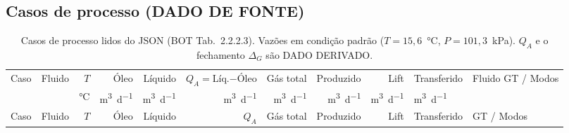 \documentclass[11pt,a4paper]{article}
\numberwithin{equation}{section}
\numberwithin{table}{section}
\numberwithin{figure}{section}
\newcommand{\tipo}[1]{\textsf{\footnotesize #1}}
\begin{document}
\begin{landscape}
\subsection{Casos de processo (DADO DE FONTE)}
\begin{longtable}{rlrrrrrrrll}
\caption{Casos de processo lidos do JSON (BOT Tab.~2.2.2.3). Vazões em condição padrão ($T=15{,}6$~\si{\celsius}, $P=101{,}3$~\si{\kilo\pascal}). $Q_A$ e o fechamento $\Delta_G$ são \tipo{DADO DERIVADO}.}\label{tab:casos}\\\toprule
Caso & Fluido & $T$ & Óleo & Líquido & $Q_A=$Líq.$-$Óleo & Gás total & Produzido & Lift & Transferido & Fluido GT / Modos\\
 & & \si{\celsius} & \si{\cubic\metre\per\day} & \si{\cubic\metre\per\day} & \si{\cubic\metre\per\day} & \si{\cubic\metre\per\day} & \si{\cubic\metre\per\day} & \si{\cubic\metre\per\day} & \si{\cubic\metre\per\day} & \\\midrule\endfirsthead
\toprule Caso & Fluido & $T$ & Óleo & Líquido & $Q_A$ & Gás total & Produzido & Lift & Transferido & GT / Modos\\\midrule\endhead


\end{longtable}
\end{landscape}
\end{document}

